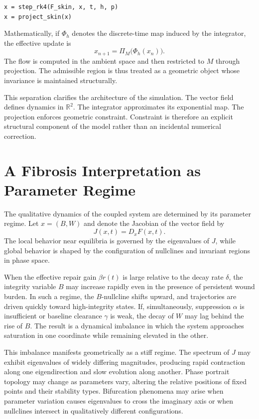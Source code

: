 \documentclass[12pt]{book}
\begin{document}
\begin{verbatim}
x = step_rk4(F_skin, x, t, h, p)
x = project_skin(x)
\end{verbatim}

Mathematically, if $\Phi_h$ denotes the discrete-time map induced by
the integrator, the effective update is
\[
x_{n+1} = \Pi_M\!\big( \Phi_h(x_n) \big).
\]
The flow is computed in the ambient space and then restricted to $M$
through projection. The admissible region is thus treated as a
geometric object whose invariance is maintained structurally.

This separation clarifies the architecture of the simulation.
The vector field defines dynamics in $\mathbb{R}^2$.
The integrator approximates its exponential map.
The projection enforces geometric constraint.
Constraint is therefore an explicit structural component of the
model rather than an incidental numerical correction.

\section{A Fibrosis Interpretation as Parameter Regime}

The qualitative dynamics of the coupled system are determined by its
parameter regime. Let $x = (B,W)$ and denote the Jacobian of the vector
field by
\[
J(x,t) = D_x F(x,t).
\]
The local behavior near equilibria is governed by the eigenvalues of
$J$, while global behavior is shaped by the configuration of nullclines
and invariant regions in phase space.

When the effective repair gain $\beta r(t)$ is large relative to the
decay rate $\delta$, the integrity variable $B$ may increase rapidly
even in the presence of persistent wound burden. In such a regime,
the $B$-nullcline shifts upward, and trajectories are driven quickly
toward high-integrity states. If, simultaneously, suppression
$\alpha$ is insufficient or baseline clearance $\gamma$ is weak,
the decay of $W$ may lag behind the rise of $B$. The result is a
dynamical imbalance in which the system approaches saturation in one
coordinate while remaining elevated in the other.

This imbalance manifests geometrically as a stiff regime. The spectrum
of $J$ may exhibit eigenvalues of widely differing magnitudes, producing
rapid contraction along one eigendirection and slow evolution along
another. Phase portrait topology may change as parameters vary,
altering the relative positions of fixed points and their stability
types. Bifurcation phenomena may arise when parameter variation causes
eigenvalues to cross the imaginary axis or when nullclines intersect
in qualitatively different configurations.
\end{document}
